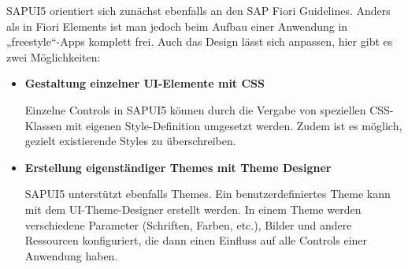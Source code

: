 SAPUI5 orientiert sich zunächst ebenfalls an den SAP Fiori Guidelines. Anders als in Fiori Elements ist man jedoch beim Aufbau einer Anwendung in „freestyle“-Apps komplett frei. Auch das Design lässt sich anpassen, hier gibt es zwei Möglichkeiten:

\begin{itemize}[noitemsep]
\item \textbf{Gestaltung einzelner UI-Elemente mit CSS } 

Einzelne Controls in SAPUI5 können durch die Vergabe von speziellen CSS-Klassen mit eigenen Style-Definition umgesetzt werden\cite[S.261]{sapui5}. Zudem ist es möglich, gezielt existierende Styles zu überschreiben.
\item \textbf{Erstellung eigenständiger Themes mit Theme Designer} 

SAPUI5 unterstützt ebenfalls Themes. Ein benutzerdefiniertes Theme kann mit dem UI-Theme-Designer erstellt werden. In einem Theme werden verschiedene Parameter (Schriften, Farben, etc.), Bilder und andere Ressourcen konfiguriert, die dann einen Einfluss auf alle Controls einer Anwendung haben\cite{saph:bas}. 
\end{itemize}






